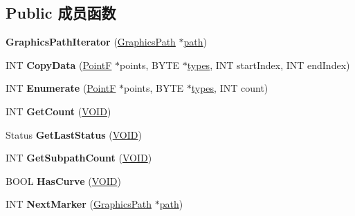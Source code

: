 \subsection*{Public 成员函数}
\begin{DoxyCompactItemize}
\item 
\mbox{\label{class_graphics_path_iterator_a5237f2559d065a93598f4f6e24f11e9b}} 
{\bfseries Graphics\+Path\+Iterator} (\hyperlink{class_graphics_path}{Graphics\+Path} $\ast$\hyperlink{structpath}{path})
\item 
\mbox{\label{class_graphics_path_iterator_aa1bf4798fa9269746ba984d847593c1d}} 
I\+NT {\bfseries Copy\+Data} (\hyperlink{struct_point_f}{PointF} $\ast$points, B\+Y\+TE $\ast$\hyperlink{structtypes}{types}, I\+NT start\+Index, I\+NT end\+Index)
\item 
\mbox{\label{class_graphics_path_iterator_a8f61f24f25eb2ab1a94711173e3648a3}} 
I\+NT {\bfseries Enumerate} (\hyperlink{struct_point_f}{PointF} $\ast$points, B\+Y\+TE $\ast$\hyperlink{structtypes}{types}, I\+NT count)
\item 
\mbox{\label{class_graphics_path_iterator_a6db8e7aefc89015117540d43b6184b93}} 
I\+NT {\bfseries Get\+Count} (\hyperlink{interfacevoid}{V\+O\+ID})
\item 
\mbox{\label{class_graphics_path_iterator_a0daba4c514e722c848c15bd1dc927d25}} 
Status {\bfseries Get\+Last\+Status} (\hyperlink{interfacevoid}{V\+O\+ID})
\item 
\mbox{\label{class_graphics_path_iterator_afe684d3ecafbf37fd632aec9f7ed63d9}} 
I\+NT {\bfseries Get\+Subpath\+Count} (\hyperlink{interfacevoid}{V\+O\+ID})
\item 
\mbox{\label{class_graphics_path_iterator_a2524f9b1e5133a56a97aea55ed178cb6}} 
B\+O\+OL {\bfseries Has\+Curve} (\hyperlink{interfacevoid}{V\+O\+ID})
\item 
\mbox{\label{class_graphics_path_iterator_aa444ad97383148cc0b9067042da682b4}} 
I\+NT {\bfseries Next\+Marker} (\hyperlink{class_graphics_path}{Graphics\+Path} $\ast$\hyperlink{structpath}{path})

\end{DoxyCompactItemize}
